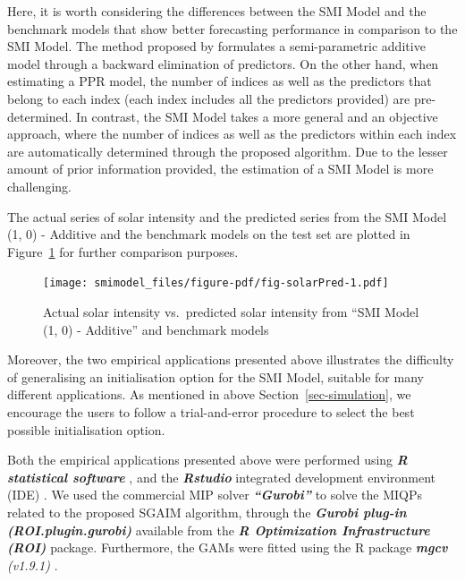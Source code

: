 \documentclass[11pt,a4paper,]{article}
\begin{document}
Here, it is worth considering the differences between the SMI Model and
the benchmark models that show better forecasting performance in
comparison to the SMI Model. The method proposed by \textcite{FH2012}
formulates a semi-parametric additive model through a backward
elimination of predictors. On the other hand, when estimating a PPR
model, the number of indices as well as the predictors that belong to
each index (each index includes all the predictors provided) are
pre-determined. In contrast, the SMI Model takes a more general and an
objective approach, where the number of indices as well as the
predictors within each index are automatically determined through the
proposed algorithm. Due to the lesser amount of prior information
provided, the estimation of a SMI Model is more challenging.

The actual series of solar intensity and the predicted series from the
SMI Model (1, 0) - Additive and the benchmark models on the test set are
plotted in Figure~\ref{fig-solarPred} for further comparison purposes.

\begin{figure}

{\centering \texttt{[image: smimodel\_files/figure-pdf/fig-solarPred-1.pdf]}

}

\caption{\label{fig-solarPred}Actual solar intensity vs.~predicted solar
intensity from ``SMI Model (1, 0) - Additive'' and benchmark models}

\end{figure}

Moreover, the two empirical applications presented above illustrates the
difficulty of generalising an initialisation option for the SMI Model,
suitable for many different applications. As mentioned in above
Section~\ref{sec-simulation}, we encourage the users to follow a
trial-and-error procedure to select the best possible initialisation
option.

Both the empirical applications presented above were performed using
\textbf{\emph{R statistical software}} \autocite{R2023}, and the
\textbf{\emph{Rstudio}} integrated development environment (IDE)
\autocite{Rstudio2024}. We used the commercial MIP solver
\textbf{\emph{``Gurobi''}} \autocite{gurobi2023} to solve the MIQPs
related to the proposed SGAIM algorithm, through the
\textbf{\emph{Gurobi plug-in (ROI.plugin.gurobi)}}
\autocite{Schwendinger2023} available from the \textbf{\emph{R
Optimization Infrastructure (ROI)}} \autocite{Hornik2023,Theusl2020}
package. Furthermore, the GAMs were fitted using the R package
\textbf{\emph{mgcv}} \emph{(v1.9.1)} \autocite{Wood2011}.
\end{document}
